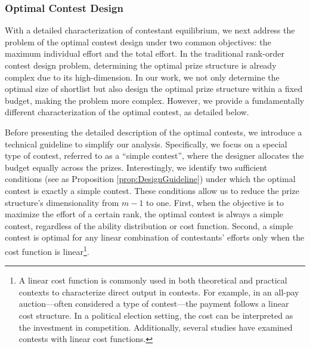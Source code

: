 \subsubsection{Optimal Contest Design}
With a detailed characterization of contestant equilibrium, we next address the problem of the optimal contest design under two common objectives: the maximum individual effort and the total effort. In the traditional rank-order contest design problem, determining the optimal prize structure is already complex due to its high-dimension. In our work, we not only determine the optimal size of shortlist but also design the optimal prize structure within a fixed budget, making the problem more complex. However, we provide a fundamentally different characterization of the optimal contest, as detailed below.


Before presenting the detailed description of the optimal contests, we introduce a technical guideline to simplify our analysis. Specifically, we focus on a special type of contest, referred to as a ``simple contest'', where the designer allocates the budget equally across the prizes. Interestingly, we identify two sufficient conditions (see as Proposition \ref{prop:DesignGuideline}) under which the optimal contest is exactly a simple contest. These conditions allow us to reduce the prize structure's dimensionality from $m-1$ to one. First, when the objective is to maximize the effort of a certain rank, the optimal contest is always a simple contest, regardless of the ability distribution or cost function. Second, a simple contest is optimal for any linear combination of contestants' efforts only when the cost function is linear\footnote{A linear cost function is commonly used in both theoretical and practical contexts to characterize direct output in contests. For example, in an all-pay auction—often considered a type of contest—the payment follows a linear cost structure. In a political election setting, the cost can be interpreted as the investment in competition. Additionally, several studies \cite{MS01, AS09, DV09} have examined contests with linear cost functions.}.



